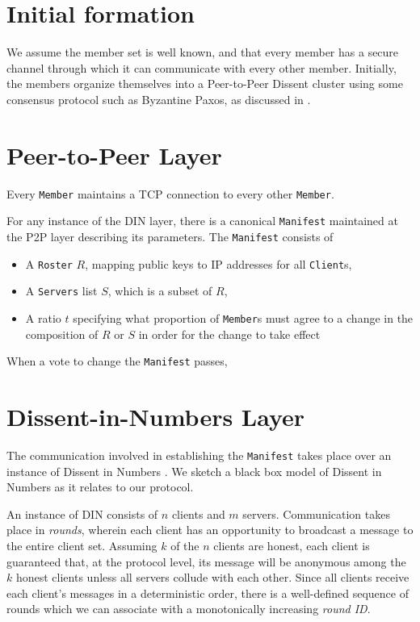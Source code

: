\section{Initial formation}
We assume the member set is well known, and that every member has a secure
channel through which it can communicate with every other member. Initially, the
members organize themselves into a Peer-to-Peer Dissent
cluster \cite{corrigan-gibbs_dissent:_2010} using some consensus protocol such
as Byzantine Paxos, as discussed in \cite{syta_security_2014}.

\section{Peer-to-Peer Layer}
Every \texttt{Member} maintains a TCP connection to every other \texttt{Member}.

For any instance of the DIN layer, there is a canonical \texttt{Manifest}
maintained at the P2P layer describing its parameters.  The \texttt{Manifest}
consists of
\begin{itemize}
  \item A \texttt{Roster} $R$, mapping public keys to IP addresses for all
    \texttt{Client}s,
  \item A \texttt{Servers} list $S$, which is a subset of $R$,
  \item A ratio $t$ specifying what proportion of \texttt{Member}s must
    agree to a change in the composition of $R$ or $S$ in order for the change
    to take effect
\end{itemize}

When a vote to change the \texttt{Manifest} passes, 

\section{Dissent-in-Numbers Layer}
The communication involved in establishing the \texttt{Manifest} takes place
over an instance of Dissent in Numbers \cite{wolinsky_dissent_2012}. We sketch a
black box model of Dissent in Numbers as it relates to our protocol.

An instance of DIN consists of $n$ clients and $m$ servers. Communication takes
place in \emph{rounds}, wherein each client has an opportunity to broadcast a
message to the entire client set. Assuming $k$ of the $n$ clients are honest,
each client is guaranteed that, at the protocol level, its message will be
anonymous among the $k$ honest clients unless all servers collude with each
other. Since all clients receive each client's
messages in a deterministic order, there is a well-defined sequence of rounds
which we can associate with a monotonically increasing \emph{round ID}.

